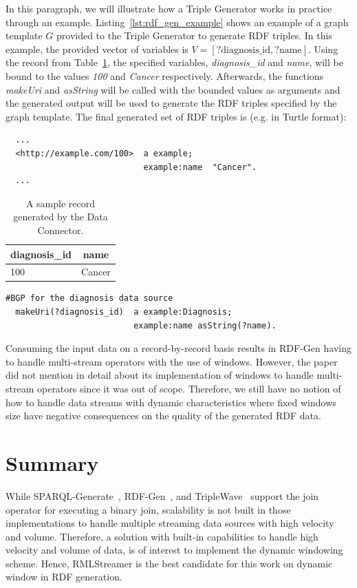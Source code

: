 In this paragraph, we will illustrate how a Triple Generator works
in practice through an example.  
Listing~\ref{lst:rdf_gen_example} shows an example of a graph template $G$ provided to 
the Triple Generator to generate RDF triples. In this example, the provided vector 
of variables is $V = [\textrm{?diagnosis\_id}, \textrm{?name} ]$. Using the record 
from Table~\ref{tab:rdf_gen_sample_record}, the specified variables,
\emph{diagnosis\_id} and \emph{name}, will be bound to the values \emph{100} and 
\emph{Cancer} respectively. Afterwards, the functions \emph{makeUri} and \emph{asString} will 
be called with the bounded values as arguments and the generated 
output will be used to generate the RDF triples specified by 
the graph template. 
The final generated set of RDF triples is (e.g. in Turtle format): 

\begin{lstlisting}
  ... 
  <http://example.com/100>  a example; 
                            example:name  "Cancer". 
  ...
\end{lstlisting}


\begin{table}[!htbp]
  \centering
  \begin{tabular}{l|l}
  \multicolumn{1}{c|}{\textbf{diagnosis\_id}} & \multicolumn{1}{c}{\textbf{name}} \\ \hline
  100                                 & Cancer                    
  \end{tabular}
  \caption{A sample record generated by the Data Connector.}
  \label{tab:rdf_gen_sample_record}
  \end{table}

\begin{lstlisting}[language={SPARQL},
   caption={A simple graph template $G$ with the functions \emph{asString} and \emph{makeUri}.}, 
   label={lst:rdf_gen_example}
  ]
  #BGP for the diagnosis data source
  makeUri(?diagnosis_id)  a example:Diagnosis;
                          example:name asString(?name).
\end{lstlisting}

Consuming the input data on a record-by-record basis results in RDF-Gen having to 
handle multi-stream operators with the use of windows. However, the paper did not 
mention in detail about its implementation of windows to handle 
multi-stream operators since it was out of scope. Therefore, we still have no 
notion of how to handle data streams with dynamic characteristics where fixed windows 
size have negative consequences on the quality of the generated RDF data. 

\section{Summary}
While SPARQL-Generate~\cite{sparql_generate}, RDF-Gen~\cite{rdf_gen}, and TripleWave~\cite{triple_wave} 
support the join operator for executing a binary join, scalability is not built in those implementations
to handle multiple streaming 
data sources with high velocity and volume. 
Therefore, a solution
with built-in capabilities to handle high velocity and volume of data, is of interest
to implement the dynamic windowing scheme. 
Hence, RMLStreamer is the best candidate for this work on dynamic window in RDF generation. 
